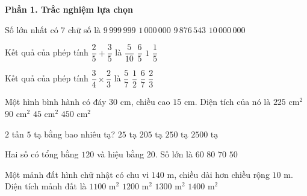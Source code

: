 \textbf{Phần 1. Trắc nghiệm lựa chọn}

\begin{ex} %
Số lớn nhất có 7 chữ số là
\choice
{\True $9\,999\,999$}
{$1\,000\,000$}
{$9\,876\,543$}
{$10\,000\,000$}
\end{ex}

\begin{ex} %
Kết quả của phép tính $\dfrac{2}{5} + \dfrac{3}{5}$ là
\choice
{$\dfrac{5}{10}$}
{$\dfrac{6}{5}$}
{\True $1$}
{$\dfrac{1}{5}$}
\end{ex}

\begin{ex} %
Kết quả của phép tính $\dfrac{3}{4} \times \dfrac{2}{3}$ là
\choice
{$\dfrac{5}{7}$}
{\True $\dfrac{1}{2}$}
{$\dfrac{6}{7}$}
{$\dfrac{2}{3}$}
\end{ex}

\begin{ex} %
Một hình bình hành có đáy $30\text{ cm}$, chiều cao $15\text{ cm}$. Diện tích của nó là
\choice
{$225\text{ cm}^2$}
{$90\text{ cm}^2$}
{$45\text{ cm}^2$}
{\True $450\text{ cm}^2$}
\end{ex}

\begin{ex} %
$2$ tấn $5$ tạ bằng bao nhiêu tạ?
\choice
{\True $25\text{ tạ}$}
{$205\text{ tạ}$}
{$250\text{ tạ}$}
{$2500\text{ tạ}$}
\end{ex}

\begin{ex} %
Hai số có tổng bằng $120$ và hiệu bằng $20$. Số lớn là
\choice
{$60$}
{$80$}
{\True $70$}
{$50$}
\end{ex}

\begin{ex} %
Một mảnh đất hình chữ nhật có chu vi $140\text{ m}$, chiều dài hơn chiều rộng $10\text{ m}$. Diện tích mảnh đất là
\choice
{$1100\text{ m}^2$}
{\True $1200\text{ m}^2$}
{$1300\text{ m}^2$}
{$1400\text{ m}^2$}
\end{ex}

